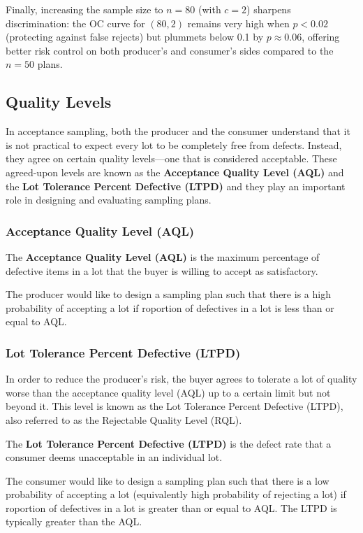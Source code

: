 \documentclass[twoside]{book}
\begin{document}
Finally, increasing the sample size to \(n=80\) (with \(c=2\)) sharpens discrimination: the OC curve for \((80,2)\) remains very high when \(p<0.02\) (protecting against false rejects) but plummets below 0.1 by \(p\approx0.06\), offering better risk control on both producer’s and consumer’s sides compared to the \(n=50\) plans.

\subsection{Quality Levels}

In acceptance sampling, both the producer and the consumer understand that it is not practical to expect every lot to be completely free from defects. Instead, they agree on certain quality levels—one that is considered acceptable. These agreed-upon levels are known as the \textbf{Acceptance Quality Level (AQL)} and the \textbf{Lot Tolerance Percent Defective (LTPD)} and they play an important role in designing and evaluating sampling plans.


\subsubsection{Acceptance Quality Level (AQL)}

\begin{textbox}
The \textbf{Acceptance Quality Level (AQL)} is the maximum percentage of defective items in a lot that the buyer is willing to accept as satisfactory.
\end{textbox}

The producer would like to design a sampling plan such that there is a high probability of accepting a lot if roportion of defectives in a lot is less than or equal to AQL.

\subsubsection{Lot Tolerance Percent Defective (LTPD)}

In order to reduce the producer’s risk, the buyer agrees to tolerate a lot of quality worse than the acceptance quality level (AQL) up to a certain limit but not beyond it. This level is known as the Lot Tolerance Percent Defective (LTPD), also referred to as the Rejectable Quality Level (RQL).

\begin{textbox}
The \textbf{Lot Tolerance Percent Defective (LTPD)} is the defect rate that a consumer deems unacceptable in an individual lot.
\end{textbox}
The consumer would like to design a sampling plan such that there is a low probability of accepting a lot (equivalently high probability of rejecting a lot) if roportion of defectives in a lot is greater than or equal to AQL. The LTPD is typically greater than the AQL.
\end{document}
